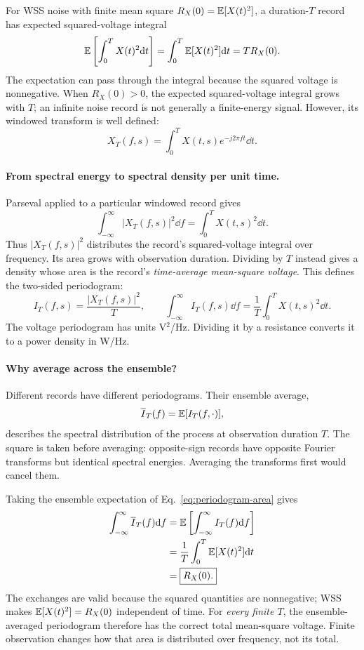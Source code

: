 For WSS noise with finite mean square $R_X(0)=\mathbb E[X(t)^2]$, a duration-$T$ record has expected squared-voltage integral
\[
\mathbb E\left[\int_0^T X(t)^2\mathrm d t\right]
=\int_0^T\mathbb E[X(t)^2]\mathrm d t=T R_X(0).
\]
The expectation can pass through the integral because the squared voltage is nonnegative. When $R_X(0)>0$, the expected squared-voltage integral grows with $T$; an infinite noise record is not generally a finite-energy signal. However, its windowed transform is well defined:
\begin{equation}
X_T(f,s)=\int_0^T X(t,s)e^{-j2\pi ft}\dd t.
\end{equation}
\paragraph{From spectral energy to spectral density per unit time.}
Parseval applied to a particular windowed record gives
\[
\int_{-\infty}^{\infty}|X_T(f,s)|^2\dd f
=\int_0^T X(t,s)^2\dd t.
\]
Thus $|X_T(f,s)|^2$ distributes the record's squared-voltage integral over frequency. Its area grows with observation duration. Dividing by $T$ instead gives a density whose area is the record's \emph{time-average mean-square voltage}. This defines the two-sided periodogram:
\begin{equation}
I_T(f,s)=\frac{|X_T(f,s)|^2}{T},\qquad
\boxed{\int_{-\infty}^{\infty}I_T(f,s)\dd f
=\frac1T\int_0^T X(t,s)^2\dd t.}
\label{eq:periodogram-area}
\end{equation}
The voltage periodogram has units V$^2$/Hz. Dividing it by a resistance converts it to a power density in W/Hz.

\paragraph{Why average across the ensemble?}
Different records have different periodograms. Their ensemble average,
\[
\overline I_T(f)=\mathbb E[I_T(f,\cdot)],
\]
describes the spectral distribution of the process at observation duration $T$. The square is taken before averaging: opposite-sign records have opposite Fourier transforms but identical spectral energies. Averaging the transforms first would cancel them.

Taking the ensemble expectation of Eq.~\eqref{eq:periodogram-area} gives
\begin{align}
\int_{-\infty}^{\infty}\overline I_T(f)\mathrm d f
&=\mathbb E\left[\int_{-\infty}^{\infty}I_T(f)\mathrm d f\right]\notag\\
&=\frac1T\int_0^T\mathbb E[X(t)^2]\mathrm d t\notag\\
&=\boxed{R_X(0).}
\label{eq:finite-spectrum-area}
\end{align}
The exchanges are valid because the squared quantities are nonnegative; WSS makes $\mathbb E[X(t)^2]=R_X(0)$ independent of time. For \emph{every finite $T$}, the ensemble-averaged periodogram therefore has the correct total mean-square voltage. Finite observation changes how that area is distributed over frequency, not its total.

